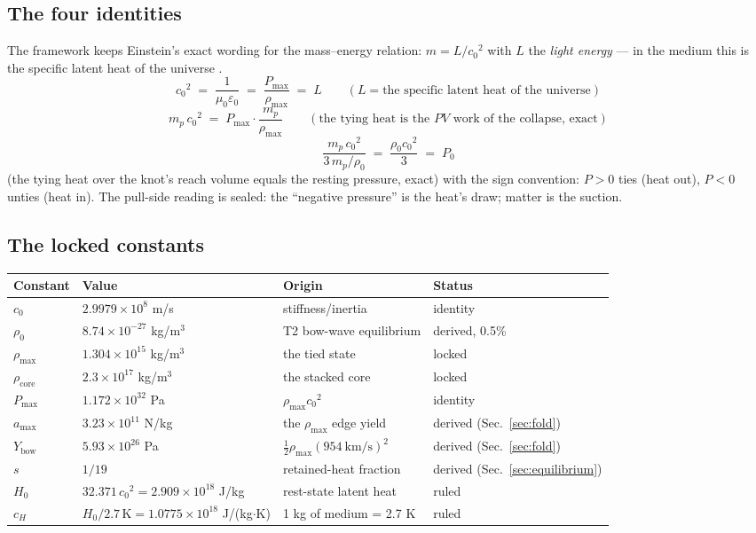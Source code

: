 \documentclass[11pt, a4paper]{article}
\newcommand{\cnot}{\ensuremath{c_0}}
\newcommand{\rhonot}{\ensuremath{\rho_0}}
\newcommand{\rhomax}{\ensuremath{\rho_{\mathrm{max}}}}
\newcommand{\rhocore}{\ensuremath{\rho_{\mathrm{core}}}}
\newcommand{\Ybow}{\ensuremath{Y_{\mathrm{bow}}}}
\newcommand{\Hnot}{\ensuremath{H_0}}
\newcommand{\snot}{\ensuremath{s}}
\begin{document}
\subsection{The four identities}
The framework keeps Einstein's exact wording for the mass--energy relation:
$m = L/\cnot^2$ with $L$ the \emph{light energy} --- in the medium this is the
specific latent heat of the universe \cite{einstein1905}.
\begin{equation}
\cnot^2 \;=\; \frac{1}{\mu_0\varepsilon_0} \;=\; \frac{P_{\max}}{\rhomax}
\;=\; L \qquad (L = \text{the specific latent heat of the universe})
\end{equation}
\begin{equation}
m_p\,\cnot^2 \;=\; P_{\max}\cdot \frac{m_p}{\rhomax} \qquad (\text{the tying heat
is the $PV$ work of the collapse, exact})
\end{equation}
\begin{equation}
\frac{m_p\,\cnot^2}{3\,m_p/\rhonot} \;=\; \frac{\rhonot \cnot^2}{3} \;=\; P_0
\end{equation}
(the tying heat over the knot's reach volume equals the resting pressure, exact)
with the sign convention: $P>0$ ties (heat out), $P<0$ unties (heat in). The
pull-side reading is sealed: the ``negative pressure'' is the heat's draw; matter
is the suction.

\subsection{The locked constants}
\begin{center}
\small
\begin{tabular}{llll}
\toprule
Constant & Value & Origin & Status \\
\midrule
$\cnot$ & $2.9979\times10^{8}$ m/s & stiffness/inertia & identity \\
$\rhonot$ & $8.74\times10^{-27}$ kg/m$^3$ & T2 bow-wave equilibrium & derived, 0.5\% \\
$\rhomax$ & $1.304\times10^{15}$ kg/m$^3$ & the tied state & locked \\
$\rhocore$ & $2.3\times10^{17}$ kg/m$^3$ & the stacked core & locked \\
$P_{\max}$ & $1.172\times10^{32}$ Pa & $\rhomax\cnot^2$ & identity \\
$a_{\max}$ & $3.23\times10^{11}$ N/kg & the $\rhomax$ edge yield & derived (Sec.~\ref{sec:fold}) \\
$\Ybow$ & $5.93\times10^{26}$ Pa & $\tfrac12\rhomax(954\ \mathrm{km/s})^2$ & derived (Sec.~\ref{sec:fold}) \cite{vandokkum2023,vandokkum2025} \\
$\snot$ & $1/19$ & retained-heat fraction & derived (Sec.~\ref{sec:equilibrium}) \\
$\Hnot$ & $32.371\,\cnot^2 = 2.909\times10^{18}$ J/kg & rest-state latent heat & ruled \\
$c_H$ & $\Hnot/2.7\,\mathrm{K} = 1.0775\times10^{18}$ J/(kg$\cdot$K) & 1 kg of medium = 2.7 K & ruled \\
\bottomrule
\end{tabular}
\end{center}
\end{document}
